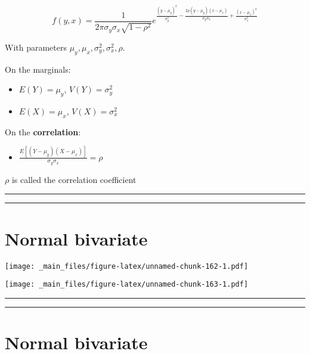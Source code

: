 \documentclass[
]{book}
\providecommand{\tightlist}{%
  \setlength{\itemsep}{0pt}\setlength{\parskip}{0pt}}
\begin{document}
\[f(y,x)=\frac{1}{2\pi \sigma_y\sigma_x \sqrt{1-\rho^2}}e^{\frac{(y-\mu_y)^2}{\sigma_y^2}-\frac{2\rho(y-\mu_y)(x-\mu_x)}{\sigma_y\sigma_x}+\frac{(x-\mu_x)^2}{\sigma_x^2}}\]

With parameters \(\mu_y, \mu_x, \sigma^2_y, \sigma_x^2, \rho\).

On the marginals:

\begin{itemize}
\tightlist
\item
  \(E(Y)=\mu_y\), \(V(Y)=\sigma^2_y\)
\item
  \(E(X)=\mu_x\), \(V(X)=\sigma^2_x\)
\end{itemize}

On the \textbf{correlation}:

\begin{itemize}
\tightlist
\item
  \(\frac{E[(Y-\mu_y)(X-\mu_x)]}{\sigma_y\sigma_x}=\rho\)
\end{itemize}

\(\rho\) is called the correlation coefficient

\begin{center}\rule{0.5\linewidth}{0.5pt}\end{center}

\begin{center}\rule{0.5\linewidth}{0.5pt}\end{center}

\hypertarget{normal-bivariate-1}{%
\section{Normal bivariate}\label{normal-bivariate-1}}

\texttt{[image: \_main\_files/figure-latex/unnamed-chunk-162-1.pdf]}

\texttt{[image: \_main\_files/figure-latex/unnamed-chunk-163-1.pdf]}

\begin{center}\rule{0.5\linewidth}{0.5pt}\end{center}

\begin{center}\rule{0.5\linewidth}{0.5pt}\end{center}

\hypertarget{normal-bivariate-2}{%
\section{Normal bivariate}\label{normal-bivariate-2}}
\end{document}
